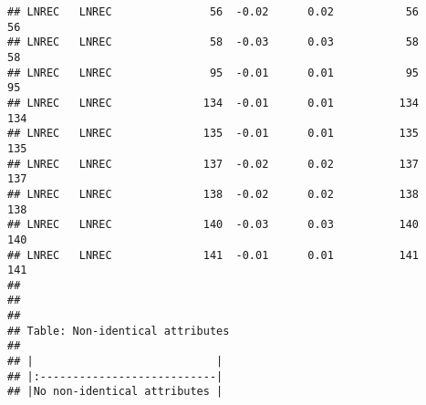 \documentclass[
]{article}
\begin{document}
\begin{verbatim}
## LNREC   LNREC               56  -0.02      0.02           56      56
## LNREC   LNREC               58  -0.03      0.03           58      58
## LNREC   LNREC               95  -0.01      0.01           95      95
## LNREC   LNREC              134  -0.01      0.01          134     134
## LNREC   LNREC              135  -0.01      0.01          135     135
## LNREC   LNREC              137  -0.02      0.02          137     137
## LNREC   LNREC              138  -0.02      0.02          138     138
## LNREC   LNREC              140  -0.03      0.03          140     140
## LNREC   LNREC              141  -0.01      0.01          141     141
## 
## 
## 
## Table: Non-identical attributes
## 
## |                            |
## |:---------------------------|
## |No non-identical attributes |
\end{verbatim}
\end{document}
